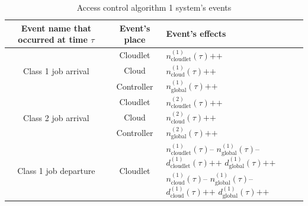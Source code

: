 \documentclass[10pt,a4paper]{article}
\begin{document}
 
\begin{table}[h!]
    \caption{Access control algorithm 1 system's events}
    \begin{adjustbox}{center=\textwidth}
    \label{table:SystemEvents}
     \begin{tabular}{c|c|p{2.5cm}}

      \toprule
      \textbf{Event name that occurred at time $\tau$} & \textbf{Event's place} & \textbf{Event's effects} \\
      \midrule
      
      \multirow{3}{*}{Class 1 job arrival} & Cloudlet & $n_{\text{cloudlet}}^{(1)}(\tau)\texttt{++}$ \\ \cline{2-3} 
      & Cloud & $n_{\text{cloud}}^{(1)}(\tau)\texttt{++}$ \\ \cline{2-3} 
      & Controller & $n_{\text{global}}^{(1)}(\tau)\texttt{++}$ \\ 
       
      \hline
       
      \multirow{3}{*}{Class 2 job arrival} & Cloudlet & $n_{\text{cloudlet}}^{(2)}(\tau)\texttt{++}$ \\ \cline{2-3} 
      & Cloud & $n_{\text{cloud}}^{(2)}(\tau)\texttt{++}$ \\ \cline{2-3} 
      & Controller & $n_{\text{global}}^{(2)}(\tau)\texttt{++}$ \\ 
    
	  \hline
       
      \multirow{8}{*}{Class 1 job departure} & \multirow{4}{*}{Cloudlet} & $n_{\text{cloudlet}}^{(1)}(\tau)\texttt{--}$ \newline $n_{\text{global}}^{(1)}(\tau)\texttt{--}$ \newline $d_{\text{cloudlet}}^{(1)}(\tau)\texttt{++}$ \newline $d_{\text{global}}^{(1)}(\tau)\texttt{++}$ \\ \cline{2-3} 
      & \multirow{4}{*}{Cloud} & $n_{\text{cloud}}^{(1)}(\tau)\texttt{--}$ \newline $n_{\text{global}}^{(1)}(\tau)\texttt{--}$ \newline $d_{\text{cloud}}^{(1)}(\tau)\texttt{++}$ \newline $d_{\text{global}}^{(1)}(\tau)\texttt{++}$ \\ \cline{2-3} 
 
 		\hline
       

\end{tabular}
\end{adjustbox}
\end{table}
\end{document}
